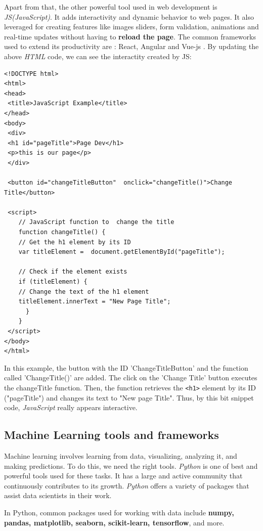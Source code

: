 \documentclass[12pt,a4paper]{report}
\begin{document}
Apart from that, the other powerful tool used in web development is \textit{JS(JavaScript)}. It adds interactivity and dynamic behavior to web pages. It also leveraged for creating features like images sliders, form validation, animations and real-time updates without having to \textbf{reload the page}. The common frameworks used to extend its productivity are : React, Angular and Vue-js \cite{wohlgethan2018supportingweb}. By updating the above \textit{HTML} code, we can see the interactity created by JS: 
\begin{lstlisting}[style=stylepython, label=lst:jsCode]
<!DOCTYPE html>
<html>
<head>
 <title>JavaScript Example</title>
</head>
<body>
 <div>
 <h1 id="pageTitle">Page Dev</h1>
 <p>this is our page</p>
 </div>
	
 <button id="changeTitleButton"  onclick="changeTitle()">Change  Title</button>
	
 <script>
 	// JavaScript function to  change the title
 	function changeTitle() {
 	// Get the h1 element by its ID
 	var titleElement =  document.getElementById("pageTitle");
	
 	// Check if the element exists
 	if (titleElement) {
	// Change the text of the h1 element
 	titleElement.innerText = "New Page Title";
	  }
	}
 </script>
</body>
</html>	
\end{lstlisting} 

In this example, the button with the ID 'ChangeTitleButton' and the function called 'ChangeTitle()' are added. The click on the 'Change Title' button executes the changeTitle function. Then, the function retrieves the \texttt{<h1>} element by its
ID ("pageTitle") and changes its text to "New page Title". Thus, by this bit snippet code, \textit{JavaScript} really appears interactive.

\subsection{\large Machine Learning tools and frameworks} 
Machine learning involves learning from data, visualizing, analyzing it, and making predictions. To do this, we need the right tools. \textit{Python} is one of best and powerful tools used for these tasks. It has a large and active community that continuously contributes to its growth. \textit{Python} offers a variety of packages that assist data scientists in their work.

In Python, common packages used for working with data include\textbf{ numpy, pandas, matplotlib, seaborn, scikit-learn, tensorflow}, and more.
\end{document}
